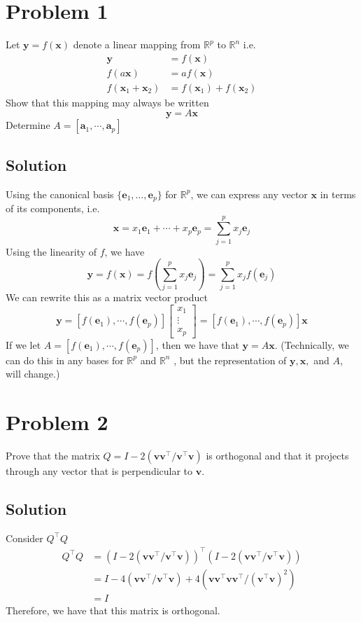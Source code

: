 \documentclass[a4paper]{article}
\begin{document}
\section*{Problem 1}%
Let $\mathbf{y} = f(\mathbf{x})$ denote a linear mapping from $\mathds{R}^p$ to $\mathds{R}^n$ i.e.
\[
  \begin{aligned}
    \mathbf{y} &= f(\mathbf{x}) \\
    f(a \mathbf{x}) &= a f(\mathbf{x}) \\
    f(\mathbf{x}_1 + \mathbf{x}_2) &= f(\mathbf{x}_1) + f(\mathbf{x}_2)
  \end{aligned}
\]
Show that this mapping may always be written
\[
  \mathbf{y} = A\mathbf{x}
\]
Determine $A = [\mathbf{a}_1, \cdots, \mathbf{a}_p]$

\subsection*{Solution}%
Using the canonical basis $\{\mathbf{e}_1, \dots, \mathbf{e}_p\}$ for  $\mathds{R}^p$, we can express any vector $\mathbf{x}$ in terms of its components, i.e.
\[
  \mathbf{x} = x_1\mathbf{e}_1 + \cdots + x_p\mathbf{e}_p = \sum_{j=1}^p x_j\mathbf{e}_j
\]
Using the linearity of $f$, we have
\[
  \mathbf{y} = f(\mathbf{x}) = f \left( \sum_{j=1}^p x_j\mathbf{e}_j\right) = \sum_{j=1}^p x_jf(\mathbf{e}_j)
\]
We can rewrite this as a matrix vector product
\[
  \mathbf{y} = [f(\mathbf{e}_1), \cdots, f(\mathbf{e}_p)]
  \begin{bmatrix}
    x_1 \\
    \vdots  \\
    x_p
  \end{bmatrix}
  =[f(\mathbf{e}_1), \cdots, f(\mathbf{e}_p)]\mathbf{x}
\]
If we let $A = [f(\mathbf{e}_1), \cdots, f(\mathbf{e}_p)]$, then we have that $\mathbf{y} = A\mathbf{x}$. (Technically, we can do this in any bases for $\mathds{R}^p$ and $\mathds{R}^n$ , but the representation of $\mathbf{y}, \mathbf{x},$ and $A$, will change.)

\section*{Problem 2}%
Prove that the matrix $Q = I - 2(\mathbf{v}\mathbf{v}^{\top}/\mathbf{v}^{\top}\mathbf{v})$ is orthogonal and that it projects through any vector that is perpendicular to $\mathbf{v}$.

\subsection*{Solution}%
Consider $Q^\top Q$
\[
  \begin{aligned}
    Q^\top Q &= (I - 2(\mathbf{v}\mathbf{v}^{\top}/\mathbf{v}^{\top}\mathbf{v}))^{\top}(I - 2(\mathbf{v}\mathbf{v}^{\top}/\mathbf{v}^{\top}\mathbf{v})) \\
             &= I - 4(\mathbf{v}\mathbf{v}^\top/\mathbf{v}^\top\mathbf{v}) + 4(\mathbf{v}\mathbf{v}^\top \mathbf{v}\mathbf{v}^\top/(\mathbf{v}^\top\mathbf{v})^2) \\
             &= I
  \end{aligned}
\]
Therefore, we have that this matrix is orthogonal.
\end{document}
